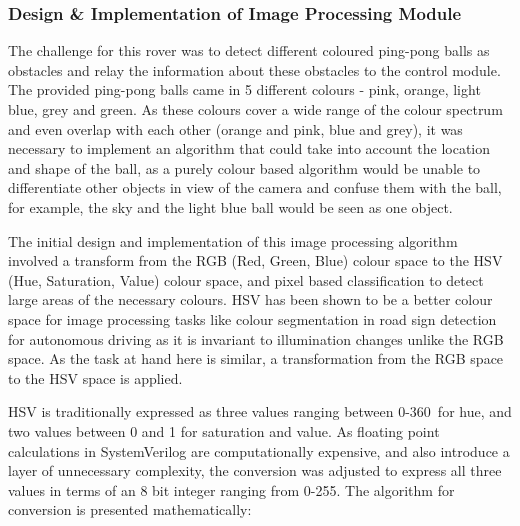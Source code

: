 \documentclass[a4paper]{article}
\begin{document}
\subsubsection{Design \& Implementation of Image Processing Module}

The challenge for this rover was to detect different coloured ping-pong balls as
obstacles and relay the information about these obstacles to the control module. 
The provided ping-pong balls came in 5 different colours - pink, orange, light 
blue, grey and green. As these colours cover a wide range of the colour spectrum
and even overlap with each other (orange and pink, blue and grey), it was 
necessary to implement an algorithm that could take into account the location 
and shape of the ball, as a purely colour based algorithm would be unable to 
differentiate other objects in view of the camera and confuse them with the ball, 
for example, the sky and the light blue ball would be seen as one object. 
 


The initial design and implementation of this image processing algorithm involved
a transform from the RGB (Red, Green, Blue) colour space to the HSV (Hue, 
Saturation, Value) colour space, and pixel based classification to detect large
areas of the necessary colours.  HSV has been shown to be a better colour space
for image processing tasks like colour segmentation in road sign detection for 
autonomous driving as it is invariant to illumination changes unlike the RGB 
space.\cite{ali2013performance} As the task at hand here is similar, a transformation
from the RGB space to the HSV space is applied. 

HSV is traditionally expressed as three values ranging between 0-360\degree\  
for hue, and two values between 0 and 1 for saturation and value.\cite{10.1145/965139.807361}
As floating point calculations in SystemVerilog are computationally expensive, 
and also introduce a layer of unnecessary complexity, the conversion was adjusted
to express all three values in terms of an 8 bit integer ranging from 0-255. The
algorithm for conversion is presented mathematically:
\end{document}
